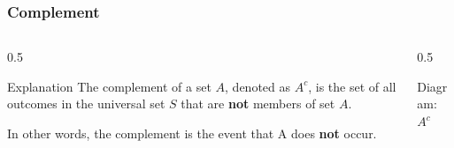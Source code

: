 \begin{frame}
    \frametitle{Complement}
    
    \begin{columns}[T]
        \begin{column}{0.5\textwidth}
            \begin{block}{Explanation}
                The complement of a set $A$, denoted as \(A^c\), is the set of all outcomes in the universal set $S$ that are \textbf{not} members of set $A$.
                \vspace{1cm}
                
                In other words, the complement is the event that A does \textbf{not} occur.
            \end{block}
        \end{column}
        
        \begin{column}{0.5\textwidth}
            \begin{block}{Diagram: \(A^c\)}
                \centering
            \end{block}
        \end{column}
    \end{columns}
\end{frame}

